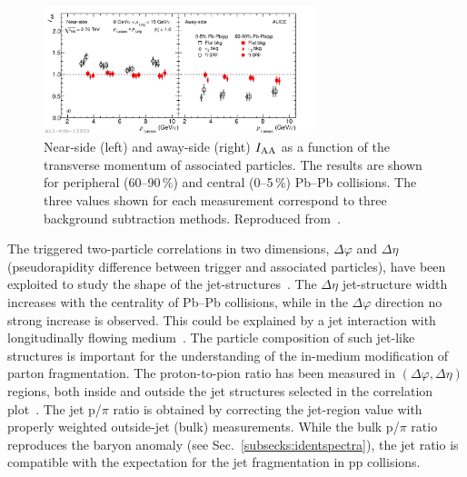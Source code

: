 \begin{figure}
\centering
\includegraphics[width=0.7\textwidth]{particlefigs/IAA.pdf}
\caption{Near-side (left) and away-side (right) $I_{\rm AA}$ as a function of the transverse momentum of associated particles. The results are shown for peripheral (60--90\,\%) and central (0--5\,\%) Pb--Pb collisions. The three values shown for each measurement correspond to three background subtraction methods. Reproduced from~\cite{Aamodt:2011vg}.}
\label{figks:IAA}
\end{figure}

The triggered two-particle correlations in two dimensions, $\Delta\varphi$ and $\Delta\eta$ (pseudorapidity difference between trigger and associated particles), have been exploited to study the shape of the jet-structures~\cite{Morsch:2012gb}. The $\Delta\eta$ jet-structure width increases with the centrality of Pb--Pb collisions, while in the $\Delta\varphi$ direction no strong increase is observed. This could be explained by a jet interaction with longitudinally flowing medium~\cite{Armesto:2004pt}. The particle composition of such jet-like structures is important for the understanding of the in-medium modification of parton fragmentation. The proton-to-pion ratio has been measured in $(\Delta\varphi, \Delta\eta)$ regions, both inside and outside the jet structures selected in the correlation plot~\cite{Veldhoen:2012ge}. The jet p/$\pi$ ratio is obtained by correcting the jet-region value with properly weighted outside-jet (bulk) measurements. While the bulk p/$\pi$ ratio reproduces the baryon anomaly (see Sec.~\ref{subsecks:identspectra}), the jet ratio is compatible with the expectation for the jet fragmentation in pp collisions.
